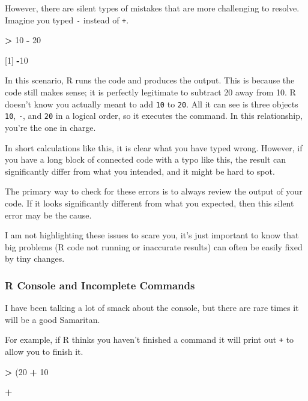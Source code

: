 \documentclass[
]{book}
\newenvironment{Shaded}{\begin{snugshade}}{\end{snugshade}}
\newcommand{\DecValTok}[1]{\textcolor[rgb]{0.00,0.00,0.81}{#1}}
\newcommand{\NormalTok}[1]{#1}
\newcommand{\SpecialCharTok}[1]{\textcolor[rgb]{0.81,0.36,0.00}{\textbf{#1}}}
\begin{document}
However, there are silent types of mistakes that are more challenging to resolve. Imagine you typed \texttt{-} instead of \texttt{+}.

\begin{Shaded}
\begin{Highlighting}[]
\SpecialCharTok{\textgreater{}} \DecValTok{10} \SpecialCharTok{{-}} \DecValTok{20}

\NormalTok{[}\DecValTok{1}\NormalTok{] }\SpecialCharTok{{-}}\DecValTok{10}
\end{Highlighting}
\end{Shaded}

In this scenario, R runs the code and produces the output. This is because the code still makes sense; it is perfectly legitimate to subtract 20 away from 10. R doesn't know you actually meant to add \texttt{10} to \texttt{20}. All it can see is three objects \texttt{10}, \texttt{-}, and \texttt{20} in a logical order, so it executes the command. In this relationship, you're the one in charge.

In short calculations like this, it is clear what you have typed wrong. However, if you have a long block of connected code with a typo like this, the result can significantly differ from what you intended, and it might be hard to spot.

The primary way to check for these errors is to always review the output of your code. If it looks significantly different from what you expected, then this silent error may be the cause.

I am not highlighting these issues to scare you, it's just important to know that big problems (R code not running or inaccurate results) can often be easily fixed by tiny changes.

\subsubsection{R Console and Incomplete Commands}\label{r-console-and-incomplete-commands}

I have been talking a lot of smack about the console, but there are rare times it will be a good Samaritan.

For example, if R thinks you haven't finished a command it will print out \texttt{+} to allow you to finish it.

\begin{Shaded}
\begin{Highlighting}[]
\SpecialCharTok{\textgreater{}}\NormalTok{ (}\DecValTok{20} \SpecialCharTok{+} \DecValTok{10}
 
\SpecialCharTok{+} 
\end{Highlighting}
\end{Shaded}
\end{document}
